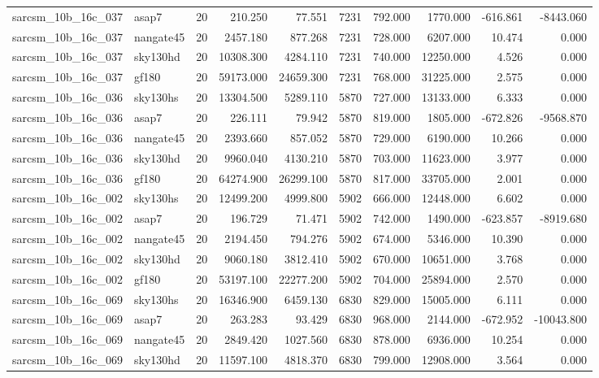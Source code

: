 \begin{longtable}{llrrrrrrrr}
sarcsm\_10b\_16c\_037 & asap7 & 20 & 210.250 & 77.551 & 7231 & 792.000 & 1770.000 & -616.861 & -8443.060 \\
sarcsm\_10b\_16c\_037 & nangate45 & 20 & 2457.180 & 877.268 & 7231 & 728.000 & 6207.000 & 10.474 & 0.000 \\
sarcsm\_10b\_16c\_037 & sky130hd & 20 & 10308.300 & 4284.110 & 7231 & 740.000 & 12250.000 & 4.526 & 0.000 \\
sarcsm\_10b\_16c\_037 & gf180 & 20 & 59173.000 & 24659.300 & 7231 & 768.000 & 31225.000 & 2.575 & 0.000 \\
sarcsm\_10b\_16c\_036 & sky130hs & 20 & 13304.500 & 5289.110 & 5870 & 727.000 & 13133.000 & 6.333 & 0.000 \\
sarcsm\_10b\_16c\_036 & asap7 & 20 & 226.111 & 79.942 & 5870 & 819.000 & 1805.000 & -672.826 & -9568.870 \\
sarcsm\_10b\_16c\_036 & nangate45 & 20 & 2393.660 & 857.052 & 5870 & 729.000 & 6190.000 & 10.266 & 0.000 \\
sarcsm\_10b\_16c\_036 & sky130hd & 20 & 9960.040 & 4130.210 & 5870 & 703.000 & 11623.000 & 3.977 & 0.000 \\
sarcsm\_10b\_16c\_036 & gf180 & 20 & 64274.900 & 26299.100 & 5870 & 817.000 & 33705.000 & 2.001 & 0.000 \\
sarcsm\_10b\_16c\_002 & sky130hs & 20 & 12499.200 & 4999.800 & 5902 & 666.000 & 12448.000 & 6.602 & 0.000 \\
sarcsm\_10b\_16c\_002 & asap7 & 20 & 196.729 & 71.471 & 5902 & 742.000 & 1490.000 & -623.857 & -8919.680 \\
sarcsm\_10b\_16c\_002 & nangate45 & 20 & 2194.450 & 794.276 & 5902 & 674.000 & 5346.000 & 10.390 & 0.000 \\
sarcsm\_10b\_16c\_002 & sky130hd & 20 & 9060.180 & 3812.410 & 5902 & 670.000 & 10651.000 & 3.768 & 0.000 \\
sarcsm\_10b\_16c\_002 & gf180 & 20 & 53197.100 & 22277.200 & 5902 & 704.000 & 25894.000 & 2.570 & 0.000 \\
sarcsm\_10b\_16c\_069 & sky130hs & 20 & 16346.900 & 6459.130 & 6830 & 829.000 & 15005.000 & 6.111 & 0.000 \\
sarcsm\_10b\_16c\_069 & asap7 & 20 & 263.283 & 93.429 & 6830 & 968.000 & 2144.000 & -672.952 & -10043.800 \\
sarcsm\_10b\_16c\_069 & nangate45 & 20 & 2849.420 & 1027.560 & 6830 & 878.000 & 6936.000 & 10.254 & 0.000 \\
sarcsm\_10b\_16c\_069 & sky130hd & 20 & 11597.100 & 4818.370 & 6830 & 799.000 & 12908.000 & 3.564 & 0.000 \\

\end{longtable}
